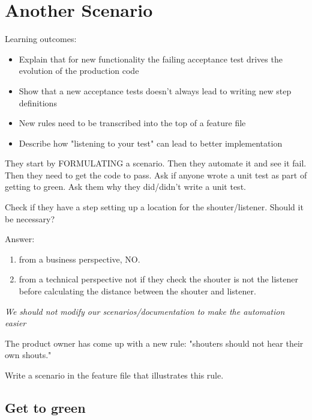 \chapter*{Another Scenario}

\ifnotes

    Learning outcomes:
    
    \begin{itemize}
        \item Explain that for new functionality the failing acceptance test drives the evolution of the production code
        \item Show that a new acceptance tests doesn't always lead to writing new step definitions
        \item New rules need to be transcribed into the top of a feature file
        \item Describe how "listening to your test" can lead to better implementation
    \end{itemize}
    
    They start by FORMULATING a scenario. Then they automate it and see it fail. Then they need to get the code to pass. Ask if anyone wrote a unit test as part of getting to green. Ask them why they did/didn't write a unit test.
    
    Check if they have a step setting up a location for the shouter/listener. Should it be necessary?
    
    Answer: 
    \begin{enumerate}
        \item from a business perspective, NO.
        \item from a technical perspective not if they check the shouter is not the listener before calculating the distance between the shouter and listener.
    \end{enumerate}  
    
    \emph{We should not modify our scenarios/documentation to make the automation easier}
    
\fi 

\ifcontent 
    The product owner has come up with a new rule: "shouters should not hear their own shouts."  
    
    Write a scenario in the feature file that illustrates this rule.
    
    
    \section*{Get to green}
    
